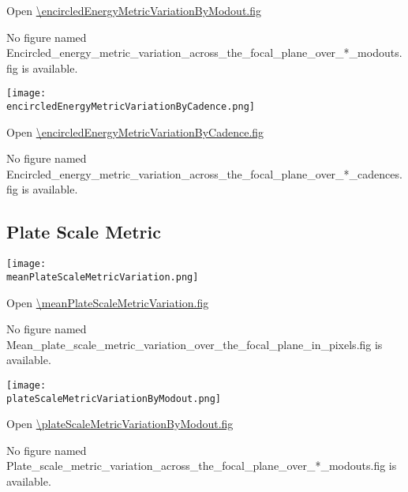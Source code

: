 \encircledEnergyMetricVariationByModoutCaption

Open \url{\encircledEnergyMetricVariationByModout.fig}

\else
No figure named
Encircled\_energy\_metric\_variation\_across\_the\_focal\_plane\_over\_*\_modouts.fig is
available.
\fi
\clearpage

\ifdefined \encircledEnergyMetricVariationByCadence

\begin{center}
  \texttt{[image: \\encircledEnergyMetricVariationByCadence.png]}
\end{center}

\encircledEnergyMetricVariationByCadenceCaption

Open \url{\encircledEnergyMetricVariationByCadence.fig}

\else
No figure named
Encircled\_energy\_metric\_variation\_across\_the\_focal\_plane\_over\_*\_cadences.fig is
available.
\fi
\clearpage

\subsection{Plate Scale Metric}

\ifdefined \meanPlateScaleMetricVariation

\begin{center}
  \texttt{[image: \\meanPlateScaleMetricVariation.png]}
\end{center}

\meanPlateScaleMetricVariationCaption

Open \url{\meanPlateScaleMetricVariation.fig}

\else
No figure named
Mean\_plate\_scale\_metric\_variation\_over\_the\_focal\_plane\_in\_pixels.fig
is available.
\fi
\clearpage

\ifdefined \plateScaleMetricVariationByModout

\begin{center}
  \texttt{[image: \\plateScaleMetricVariationByModout.png]}
\end{center}

\plateScaleMetricVariationByModoutCaption

Open \url{\plateScaleMetricVariationByModout.fig}

\else
No figure named
Plate\_scale\_metric\_variation\_across\_the\_focal\_plane\_over\_*\_modouts.fig
is available.
\fi
\clearpage

\ifdefined \plateScaleMetricVariationByCadence

